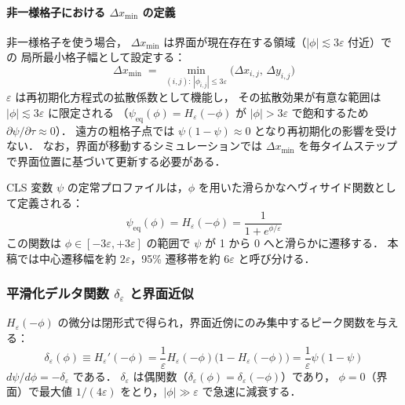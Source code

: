 \paragraph{非一様格子における $\Delta x_{\min}$ の定義}
非一様格子を使う場合，
$\Delta x_{\min}$ は界面が現在存在する領域（$|\phi| \lesssim 3\varepsilon$ 付近）での
局所最小格子幅として設定する：
\[
  \Delta x_{\min}
  \;=\; \min_{(i,j):\,|\phi_{i,j}| \le 3\varepsilon}\!\bigl(\Delta x_{i,j},\,\Delta y_{i,j}\bigr)
\]
$\varepsilon$ は再初期化方程式の拡散係数として機能し，
その拡散効果が有意な範囲は $|\phi| \lesssim 3\varepsilon$ に限定される
（$\psi_{\mathrm{eq}}(\phi) = H_\varepsilon(-\phi)$ が $|\phi| > 3\varepsilon$ で飽和するため
$\partial\psi/\partial\tau \approx 0$）．
遠方の粗格子点では $\psi(1-\psi) \approx 0$ となり再初期化の影響を受けない．
なお，界面が移動するシミュレーションでは
$\Delta x_{\min}$ を毎タイムステップで界面位置に基づいて更新する必要がある．

CLS 変数 $\psi$ の定常プロファイルは，$\phi$ を用いた滑らかなヘヴィサイド関数として定義される：
\begin{equation}
  \psi_{\text{eq}}(\phi) = H_\varepsilon(-\phi) = \frac{1}{1 + e^{\phi/\varepsilon}}
\end{equation}
この関数は $\phi \in [-3\varepsilon, +3\varepsilon]$ の範囲で $\psi$ が 1 から 0 へと滑らかに遷移する．
本稿では中心遷移幅を約 $2\varepsilon$，95\% 遷移帯を約 $6\varepsilon$ と呼び分ける．

\subsubsection{平滑化デルタ関数 \texorpdfstring{$\delta_\varepsilon$}{δ\_ε} と界面近似}
\label{sec:smoothed_delta}

$H_\varepsilon(-\phi)$ の微分は閉形式で得られ，界面近傍にのみ集中するピーク関数を与える：
\begin{equation}
  \delta_\varepsilon(\phi) \equiv H_\varepsilon'(-\phi)
  = \frac{1}{\varepsilon}H_\varepsilon(-\phi)\bigl(1-H_\varepsilon(-\phi)\bigr)
  = \frac{1}{\varepsilon}\psi(1-\psi)
  \label{eq:delta_eps_def}
\end{equation}
$d\psi/d\phi=-\delta_\varepsilon$ である．
$\delta_\varepsilon$ は偶関数（$\delta_\varepsilon(\phi) = \delta_\varepsilon(-\phi)$）であり，
$\phi=0$（界面）で最大値 $1/(4\varepsilon)$ をとり，$|\phi| \gg \varepsilon$ で急速に減衰する．

